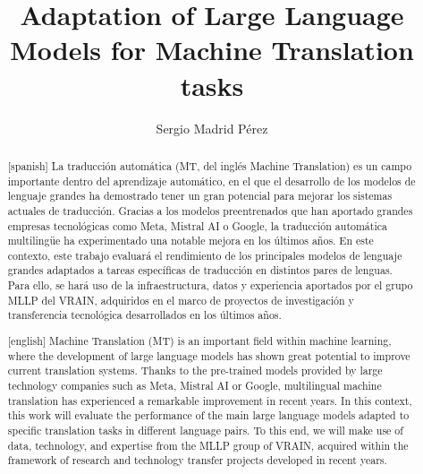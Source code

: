 \documentclass[11pt,english,listoffigures,listoftables]{tfgetsinf}
\title{Adaptation of Large Language Models for Machine Translation tasks}
\author{Sergio Madrid Pérez}
\begin{document}

\begin{abstract}[spanish]
La traducción automática (MT, del inglés Machine Translation) es un campo importante dentro del aprendizaje automático, en el que el desarrollo de los modelos de lenguaje grandes ha demostrado tener un gran potencial para mejorar los sistemas actuales de traducción. Gracias a los modelos preentrenados que han aportado grandes empresas tecnológicas como Meta, Mistral AI o Google, la traducción automática multilingüe ha experimentado una notable mejora en los últimos años. En este contexto, este trabajo evaluará el rendimiento de los principales modelos de lenguaje grandes adaptados a tareas específicas de traducción en distintos pares de lenguas. Para ello, se hará uso de la infraestructura, datos y experiencia aportados por el grupo MLLP del VRAIN, adquiridos en el marco de proyectos de investigación y transferencia tecnológica desarrollados en los últimos años. 
\end{abstract}
\begin{abstract}[english]
Machine Translation (MT) is an important field within machine learning, where the development of large language models has shown great potential to improve current translation systems. Thanks to the pre-trained models provided by large technology companies such as Meta, Mistral AI or Google, multilingual machine translation has experienced a remarkable improvement in recent years. In this context, this work will evaluate the performance of the main large language models adapted to specific translation tasks in different language pairs. To this end, we will make use of data, technology, and expertise from the MLLP group of VRAIN, acquired within the framework of research and technology transfer projects developed in recent years.
\end{abstract}


\mainmatter
\end{document}
